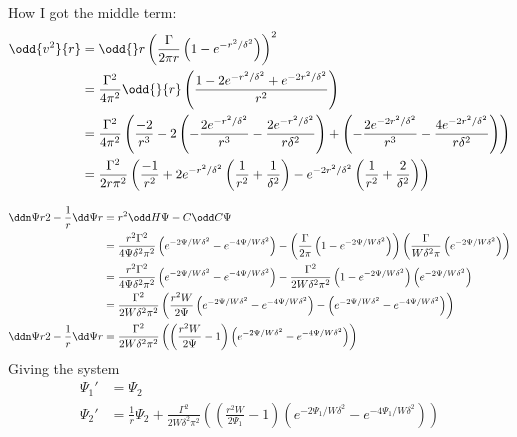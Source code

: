 \documentclass{X:/Documents/Coding/Latex/myreport}
\begin{document}
How I got the middle term:
\begin{align*}
    \odd{v^2}{r} &= \odd{}r \left(\frac{\Gamma}{2\pi r} \left(1-e^{-r^2/\delta^2}\right)\right)^2\\
    &= \frac{\Gamma^2}{4\pi^2} \odd{}{r} \left(\frac{1 - 2e^{-r^2/\delta^2} + e^{-2r^2/\delta^2}}{r^2}\right)\\
    &= \frac{\Gamma^2}{4\pi^2} \left(\frac{-2}{r^3} -2\left(-\frac{2e^{-r^2/\delta^2}}{r^3} - \frac{2e^{-r^2/\delta^2}}{r\delta^2}\right) + \left(-\frac{2e^{-2r^2/\delta^2}}{r^3} - \frac{4e^{-2r^2/\delta^2}}{r \delta^2}\right)\right)\\
    &= \frac{\Gamma^2}{2r\pi^2} \left(\frac{-1}{r^2} +2e^{-r^2/\delta^2}\left(\frac{1}{r^2} + \frac{1}{\delta^2}\right) -e^{-2r^2/\delta^2} \left(\frac{1}{r^2} + \frac{2}{ \delta^2}\right)\right)
\end{align*}


\begin{align*}
    \ddn\Psi r2 - \frac1r \dd\Psi r &=  r^2 \odd H\Psi - C \odd C\Psi\\
    &=\frac{r^2\Gamma^2}{4\Psi\delta^2\pi^2} \left(e^{-2\Psi/W\delta^2} - e^{-4\Psi/W\delta^2}\right) - \left(\frac{\Gamma}{2\pi} \left(1-e^{-2\Psi/W\delta^2}\right)\right)\left(\frac{\Gamma}{W\delta^2\pi} \left(e^{-2\Psi/W\delta^2}\right)\right)\\
    &=\frac{r^2\Gamma^2}{4\Psi\delta^2\pi^2} \left(e^{-2\Psi/W\delta^2} - e^{-4\Psi/W\delta^2}\right) - \frac{\Gamma^2}{2W\delta^2\pi^2}\left(1-e^{-2\Psi/W\delta^2}\right) \left(e^{-2\Psi/W\delta^2}\right)\\
    &= \frac{\Gamma^2}{2W\delta^2\pi^2}\left(\frac{r^2W}{2\Psi} \left(e^{-2\Psi/W\delta^2} - e^{-4\Psi/W\delta^2}\right) -\left(e^{-2\Psi/W\delta^2}-e^{-4\Psi/W\delta^2}\right)\right)\\
    \ddn\Psi r2 - \frac1r \dd\Psi r &=  \frac{\Gamma^2}{2W\delta^2\pi^2}\left(\left(\frac{r^2W}{2\Psi} - 1\right) \left(e^{-2\Psi/W\delta^2} - e^{-4\Psi/W\delta^2}\right) \right)\\
\end{align*}
Giving the system
\begin{align*}
    \Psi_1 ' &= \Psi_2\\
    \Psi_2' &= \frac1r \Psi_2 + \frac{\Gamma^2}{2W\delta^2\pi^2}\left(\left(\frac{r^2W}{2\Psi_1} - 1\right) \left(e^{-2\Psi_1/W\delta^2} - e^{-4\Psi_1/W\delta^2}\right) \right)\\
\end{align*}
\end{document}
